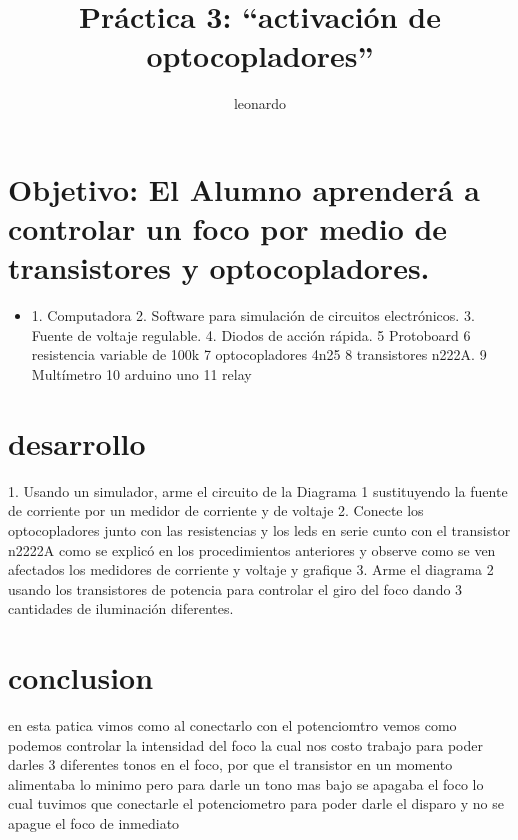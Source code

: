 \documentclass[12pt,a4paper]{article}
\author{leonardo}
\title{Práctica 3: “activación de optocopladores”}
\begin{document}
\section{Objetivo: El Alumno aprenderá a controlar un foco por medio de transistores y optocopladores.}
\begin{flushleft}
\begin{itemize}
\item 1.	Computadora
2.	Software para simulación de circuitos electrónicos.
3.	Fuente de voltaje regulable.
4.	Diodos de acción rápida.
    5   Protoboard
    6   resistencia variable de 100k
7	optocopladores 4n25
    8   transistores n222A.
9   Multímetro
10  arduino uno
11   relay

\end{itemize}
\end{flushleft}
\section{desarrollo}
\begin{flushleft}
1.	Usando un simulador, arme el circuito de la Diagrama 1 sustituyendo la fuente de corriente por un medidor de corriente y de voltaje
2.	Conecte los optocopladores junto con las resistencias y los leds en serie cunto con el transistor n2222A como se explicó en los procedimientos anteriores y observe como se ven afectados los medidores de corriente y voltaje y grafique
3.	Arme el diagrama 2 usando los transistores de potencia para controlar el giro del foco dando 3 cantidades de iluminación diferentes.
\end{flushleft}
\section{conclusion}
en esta patica vimos como al conectarlo con el potenciomtro vemos como podemos controlar la intensidad del foco la cual nos costo trabajo para poder darles 3 diferentes tonos en el foco, por que el transistor en un momento alimentaba lo minimo pero para darle un tono mas bajo se apagaba el foco lo cual tuvimos que conectarle el potenciometro para poder darle el disparo y no se apague el foco de inmediato 
\end{document}
